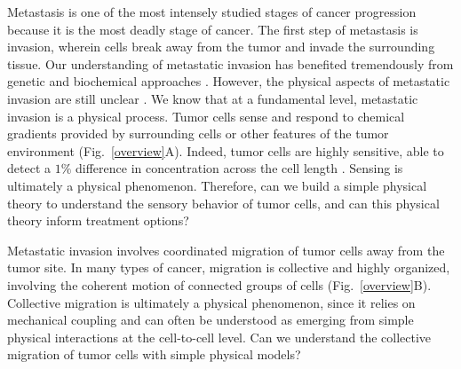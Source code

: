 

Metastasis is one of the most intensely studied stages of cancer progression because it is the most deadly stage of cancer. The first step of metastasis is invasion, wherein cells break away from the tumor and invade the surrounding tissue. Our understanding of metastatic invasion has benefited tremendously from genetic and biochemical approaches \cite{leber2009molecular, hanahan2000hallmarks, hanahan2011hallmarks}. However, the physical aspects of metastatic invasion are still unclear \cite{hanahan2011hallmarks}. We know that at a fundamental level, metastatic invasion is a physical process. Tumor cells sense and respond to chemical gradients provided by surrounding cells
\cite{bhowmick2004stromal, condeelis2006macrophages, shields2007autologous, puliafito2015three} or other features of the tumor environment
\cite{shields2007autologous, polacheck2011interstitial, shieh2011regulation} (Fig.\ \ref{overview}A). Indeed, tumor cells are highly sensitive, able to detect a $1\%$ difference in concentration across the cell length
\cite{shields2007autologous}. Sensing is ultimately a physical phenomenon. Therefore, can we build a simple physical theory to understand the sensory behavior of tumor cells, and can this physical theory inform treatment options?

Metastatic invasion involves coordinated migration of tumor cells away from the tumor site. In many types of cancer, migration is collective and highly organized, involving the coherent motion of connected groups of cells
\cite{cheung2013collective, friedl2012classifying, aceto2014circulating, puliafito2015three}
(Fig.\ \ref{overview}B).
Collective migration is ultimately a physical phenomenon, since it relies on mechanical coupling and can often be understood as emerging from simple physical interactions at the cell-to-cell level. Can we understand the collective migration of tumor cells with simple physical models?

